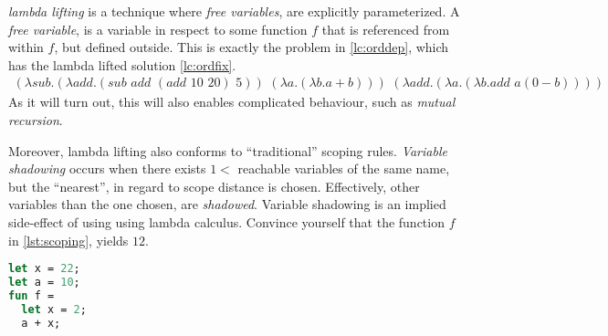 \documentclass[11pt,oneside,a4paper]{report}
\begin{document}
\textit{lambda lifting} is a technique where \textit{free variables}, are explicitly parameterized\cite{johnsson1985lambda}.
A \textit{free variable}, is a variable in respect to some function $f$ that is referenced from within $f$, but defined outside. 
This is exactly the problem in \autoref{lc:orddep}, which has the lambda lifted solution \autoref{lc:ordfix}.
\begin{align}
(\lambda sub . (\lambda add . (sub \,\, add \,\, (add \,\, 10 \,\, 20) \,\, 5)) \,\, (\lambda a . (\lambda b . a + b))) \,\, (\lambda add .(\lambda a . (\lambda b . add \,\, a (0 - b))))
\label{lc:ordfix}
\end{align}
As it will turn out, this will also enables complicated behaviour, such as \textit{mutual recursion}.

Moreover, lambda lifting also conforms to ``traditional'' scoping rules.
\textit{Variable shadowing} occurs when there exists $1 < $ reachable variables of the same name, but the ``nearest'', in regard to scope distance is chosen.
Effectively, other variables than the one chosen, are \textit{shadowed}.
Variable shadowing is an implied side-effect of using using lambda calculus.
Convince yourself that the function $f$ in \autoref{lst:scoping}, yields $12$.
\begin{lstlisting}[language=ML,caption={Scoping rules in programming languages},label={lst:scoping},xleftmargin=.32\textwidth]
let x = 22;
let a = 10;
fun f = 
  let x = 2;
  a + x;
\end{lstlisting}
\end{document}
